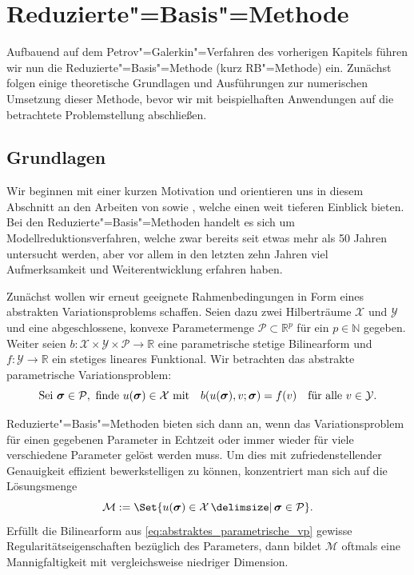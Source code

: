 \documentclass[../main.tex]{subfiles}
\begin{document}
\chapter{Reduzierte"=Basis"=Methode} %
\label{chapter:rbm}

Aufbauend auf dem Petrov"=Galerkin"=Verfahren des vorherigen Kapitels führen wir nun die Reduzierte"=Basis"=Methode (kurz RB"=Methode) ein.
Zunächst folgen einige theoretische Grundlagen und Ausführungen zur numerischen Umsetzung dieser Methode, bevor wir mit  beispielhaften Anwendungen auf die betrachtete Problemstellung abschließen.

\section{Grundlagen} %
\label{sub:grb:rb:grundlagen}

Wir beginnen mit einer kurzen Motivation und orientieren uns in diesem Abschnitt an den Arbeiten von \textcite{Rozza2008} sowie \textcite{Patera:2007un}, welche einen weit tieferen Einblick bieten.
Bei den Reduzierte"=Basis"=Methoden handelt es sich um Modellreduktionsverfahren, welche zwar bereits seit etwas mehr als 50 Jahren untersucht werden, aber vor allem in den letzten zehn Jahren viel Aufmerksamkeit und Weiterentwicklung erfahren haben.

Zunächst wollen wir erneut geeignete Rahmenbedingungen in Form eines abstrakten Variationsproblems schaffen.
Seien dazu zwei Hilberträume $\mathcal X$ und $\mathcal Y$ und eine abgeschlossene, konvexe Parametermenge $\mathcal P \subset \mathbb{R}^{p}$ für ein $p \in \mathbb{N}$ gegeben.
Weiter seien $b \colon \mathcal X \times \mathcal Y \times \mathcal P \to \mathbb{R}$ eine parametrische stetige Bilinearform und $f \colon \mathcal Y \to \mathbb{R}$ ein stetiges lineares Funktional.
Wir betrachten das abstrakte parametrische Variationsproblem:
\begin{equation}
\label{eq:abstraktes_parametrische_vp}
    \text{Sei } \bm \sigma \in \mathcal P, \text{ finde } u(\bm \sigma) \in \mathcal X \text{ mit} \quad b(u(\bm \sigma), v; \bm \sigma) = f(v) \quad \fa v \in \mathcal Y.
\end{equation}

Reduzierte"=Basis"=Methoden bieten sich dann an, wenn das Variationsproblem für einen gegebenen Parameter in Echtzeit oder immer wieder für viele verschiedene Parameter gelöst werden muss.
Um dies mit zufriedenstellender Genauigkeit effizient bewerkstelligen zu können, konzentriert man sich auf die Lösungsmenge
\begin{equation}
\label{eq:stetige_loesungsmenge}
    \mathcal M := \Set{u(\bm \sigma) \in \mathcal X \given \bm \sigma \in \mathcal P}.
\end{equation}
Erfüllt die Bilinearform aus \cref{eq:abstraktes_parametrische_vp} gewisse Regularitätseigenschaften bezüglich des Parameters, dann bildet $\mathcal M$ oftmals eine Mannigfaltigkeit mit vergleichsweise niedriger Dimension.
\end{document}
